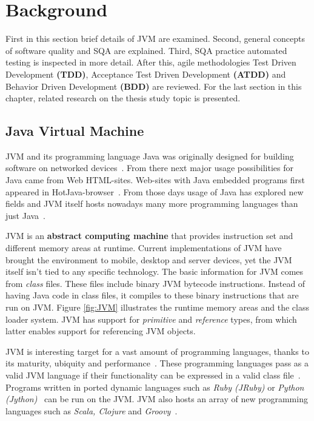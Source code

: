 \chapter{Background}
\label{chapter:background} 

First in this section brief details of JVM are examined.
Second, general concepts of software quality and SQA are explained.
Third, SQA practice automated testing is inspected in more detail.
After this, agile methodologies Test Driven Development \textbf{(TDD)}, Acceptance Test Driven Development
\textbf{(ATDD)} and Behavior Driven Development \textbf{(BDD)} are reviewed. For the last section in this chapter,
related research on the thesis study topic is presented.

\section{Java Virtual Machine} %
    JVM and its programming language Java was originally designed for building software on networked devices~\cite{lindholm2015java}. From there
    next major usage possibilities for Java came from Web HTML-sites. Web-sites with Java embedded programs first appeared in HotJava-browser~\cite{lindholm2015java}.
    From those days usage of Java has explored new fields and JVM itself hosts nowadays many more programming languages than
    just Java~\cite{wiki:jvm}.

    JVM is an \textbf{abstract computing machine} that provides instruction set and different memory areas at runtime.
    Current implementations of JVM have brought the environment to mobile, desktop and server devices, yet the JVM itself
    isn't tied to any specific technology. The basic information for JVM comes from \textit{class} files. These files include
    binary JVM bytecode instructions. Instead of having Java code in class files, it compiles to these binary instructions
    that are run on JVM. Figure \ref{fig:JVM} illustrates the runtime memory areas and the class loader system.
    JVM has support for \textit{primitive} and \textit{reference} types, from which latter enables support for referencing JVM objects. ~\cite{lindholm2015java}

    JVM is interesting target for a vast amount of programming languages, thanks to its maturity, ubiquity and performance~\cite{sarimbekov2013characteristics}.
    These programming languages pass as a valid JVM language if their functionality can be expressed in a valid class file~\cite{wiki:jvm}.
    Programs written in ported dynamic languages such as \textit{Ruby (JRuby)} or \textit{Python (Jython)}~\cite{sarimbekov2013characteristics} can be run on the JVM.
    JVM also hosts an array of new programming languages such as \textit{Scala, Clojure} and \textit{Groovy}~\cite{wiki:jvm}.

